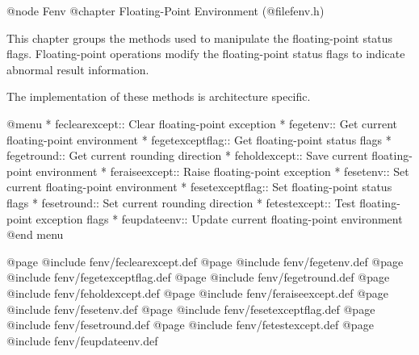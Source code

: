 @node Fenv
@chapter Floating-Point Environment (@file{fenv.h})

This chapter groups the methods used to manipulate the floating-point
status flags. Floating-point operations modify the floating-point
status flags to indicate abnormal result information.

The implementation of these methods is architecture specific.

@menu
* feclearexcept::		Clear floating-point exception
* fegetenv::		Get current floating-point environment
* fegetexceptflag::	Get floating-point status flags
* fegetround::		Get current rounding direction
* feholdexcept::		Save current floating-point environment
* feraiseexcept::		Raise floating-point exception
* fesetenv::		Set current floating-point environment
* fesetexceptflag::	Set floating-point status flags
* fesetround::		Set current rounding direction
* fetestexcept::		Test floating-point exception flags
* feupdateenv::		Update current floating-point environment
@end menu

@page
@include fenv/feclearexcept.def
@page
@include fenv/fegetenv.def
@page
@include fenv/fegetexceptflag.def
@page
@include fenv/fegetround.def
@page
@include fenv/feholdexcept.def
@page
@include fenv/feraiseexcept.def
@page
@include fenv/fesetenv.def
@page
@include fenv/fesetexceptflag.def
@page
@include fenv/fesetround.def
@page
@include fenv/fetestexcept.def
@page
@include fenv/feupdateenv.def
